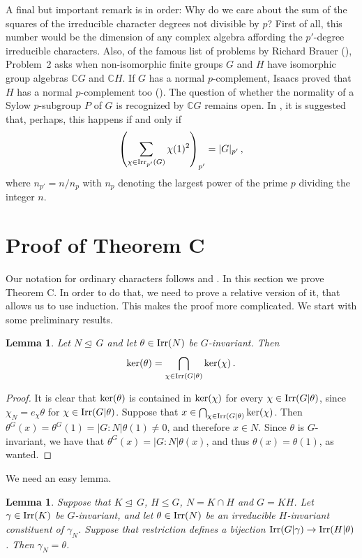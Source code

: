 \documentclass[12pt]{amsart}
\theoremstyle{plain}
\newtheorem{lem}[thm]{Lemma}
\theoremstyle{definition}
\numberwithin{equation}{section}
\newcommand{\C}{\mathbf{C}}
\def\irrp#1{{\rm Irr}_{p'}(#1)}
\def\C{{\mathbb C}}
\def\irr#1{{\rm Irr}(#1)}
\def\nor{\trianglelefteq\,}
\def\ker#1{{\rm ker}(#1)}
\begin{document}
A final but important remark is in order: Why do we care about the
sum of the squares of the irreducible character degrees not
divisible by $p$? First of all, this number would be the dimension
of any complex algebra affording the $p'$-degree irreducible
characters. Also, of the famous list of problems by Richard Brauer
(\cite{B}), Problem~2 asks when non-isomorphic finite  groups $G$
and $H$ have isomorphic group algebras $\C G$ and $\C H$. If $G$ has
a normal $p$-complement, Isaacs proved that $H$ has a normal
$p$-complement too (\cite[Theorem 7.8]{N}). The question of whether
the normality of a Sylow $p$-subgroup $P$ of $G$ is recognized by
$\C G$ remains open. In \cite{N03}, it is suggested that, perhaps,
this happens if and only if
$$\left(\sum_{\chi \in \irrp G} \chi(1)^2\right)_{p'}=|G|_{p'}\, , $$
where $n_{p'}=n/n_p$ with $n_p$ denoting the largest power of the
prime $p$ dividing the integer $n$.


\section{Proof of Theorem C}
Our notation for ordinary characters follows \cite{Is} and \cite{N}.
In this section we prove Theorem C. In order to do that, we need to
prove a relative version of it, that allows us to use induction.
This makes the proof more complicated. We start with some
preliminary results.

\begin{lem}\label{ker}
   Let $N\nor G$ and let $\theta \in \irr N$ be $G$-invariant.
   Then
   $$\ker\theta=\bigcap_{\chi \in \irr{G|\theta}} \ker\chi \, .$$
\end{lem}
\begin{proof}
It is clear that $\ker\theta$ is contained in  $\ker\chi$ for every
$\chi \in \irr{G|\theta}$, since $\chi_N=e_\chi \theta$ for $\chi
\in \irr{G|\theta}$. Suppose that $x \in \bigcap_{\chi \in
\irr{G|\theta}} \ker\chi$. Then
$\theta^G(x)=\theta^G(1)=|G:N|\theta(1) \ne 0$, and therefore $x \in N$.
Since $\theta$ is $G$-invariant, we have that
$\theta^G(x)=|G:N|\theta(x)$, and thus $\theta(x)=\theta(1)$,
 as wanted.
\end{proof}
We need an easy lemma.

\begin{lem}\label{deg}
Suppose that $K \nor G$, $H\le G$, $N=K\cap H$ and $G=KH$. Let
$\gamma \in \irr K$ be $G$-invariant, and let $\theta \in \irr N$ be
an irreducible $H$-invariant constituent of $\gamma_N$. Suppose that
restriction defines a bijection $\irr{G|\gamma} \rightarrow
\irr{H|\theta}$. Then $\gamma_N=\theta$.
\end{lem}
\end{document}
